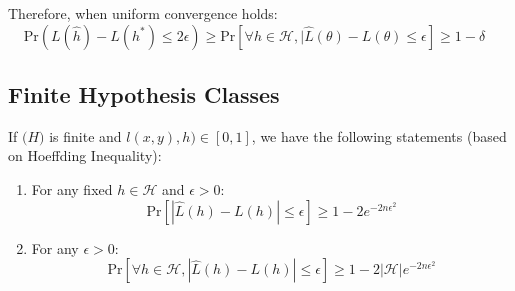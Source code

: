 \documentclass{article}
\begin{document}
Therefore, when uniform convergence holds:
\begin{equation}
\mathrm{Pr}(L(\hat{h})-L(h^{*})\leq 2\epsilon)\geq\mathrm{Pr}[\forall h \in \mathcal{H}, | \hat{L}(\theta)-L(\theta)\leq \epsilon]\geq 1-\delta
\begin{aligned}
\end{aligned}
\end{equation}

\subsection{Finite Hypothesis Classes}
If \(\mathcal(H)\) is finite and \(l(x, y), h)\in [0, 1]\), we have the
following statements (based on Hoeffding Inequality):
\begin{enumerate}
\item For any fixed \(h\in \mathcal{H}\) and \(\epsilon > 0\):
\begin{equation*}
\mathrm{Pr}[|\hat{L}(h)-L(h)|\leq \epsilon] \geq 1 - 2e^{-2n\epsilon^2}
\end{equation*}
\item For any \(\epsilon > 0\):
\begin{equation*}
\mathrm{Pr}[\forall h\in \mathcal{H}, | \hat{L}(h) - L(h)| \leq \epsilon]\geq 1 - 2|\mathcal{H}|e^{-2n\epsilon^2}
\end{equation*}
\end{enumerate}
\end{document}
